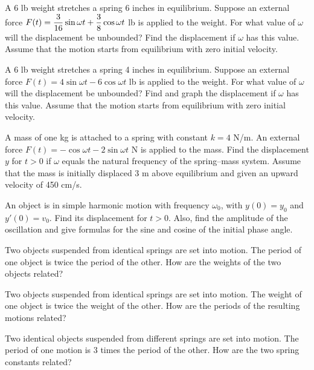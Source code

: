 \begin{exerciselist}
  \item\label{exer:6.1.15} A 6 lb weight stretches a spring 6 inches in equilibrium. Suppose an
        external force $F(t)=\displaystyle\frac{3}{16}\sin\omega t+\displaystyle\frac{3}{8}\cos\omega t$ lb is applied
        to the weight. For what value of $\omega$ will the displacement be unbounded? Find the
        displacement if $\omega$ has this value. Assume that the motion starts from equilibrium with
        zero initial velocity.

  \item\label{exer:6.1.16} \CGex A 6 lb weight stretches a spring 4 inches in equilibrium. Suppose
        an external force $F(t)=4\sin\omega t-6\cos\omega t$ lb is applied to the weight. For what
        value of $\omega$ will the displacement be unbounded? Find and graph the displacement if
        $\omega$ has this value. Assume that the motion starts from equilibrium with zero initial
        velocity.

  \item\label{exer:6.1.17} A mass of one kg is attached to a spring with constant $k=4$ N/m. An
        external force $F(t)=-\cos\omega t-2\sin\omega t$ N is applied to the mass. Find the
        displacement $y$ for $t>0$ if $\omega$ equals the natural frequency of the spring--mass
        system. Assume that the mass is initially displaced 3 m above equilibrium and given an
        upward velocity of 450 cm/s.

  \item\label{exer:6.1.18} An object is in simple harmonic motion with frequency $\omega_{0}$, with
        $y(0)=y_{0}$ and $y'(0)=v_{0}$. Find its displacement for $t>0$. Also, find the amplitude of
        the oscillation and give formulas for the sine and cosine of the initial phase angle.

  \item\label{exer:6.1.19} Two objects suspended from identical springs are set into motion. The
        period of one object is twice the period of the other. How are the weights of the two
        objects related?

  \item\label{exer:6.1.20} Two objects suspended from identical springs are set into motion. The
        weight of one object is twice the weight of the other. How are the periods of the resulting
        motions related?

  \item\label{exer:6.1.21} Two identical objects suspended from different springs are set into
        motion. The period of one motion is 3 times the period of the other. How are the two spring
        constants related?
\end{exerciselist}
